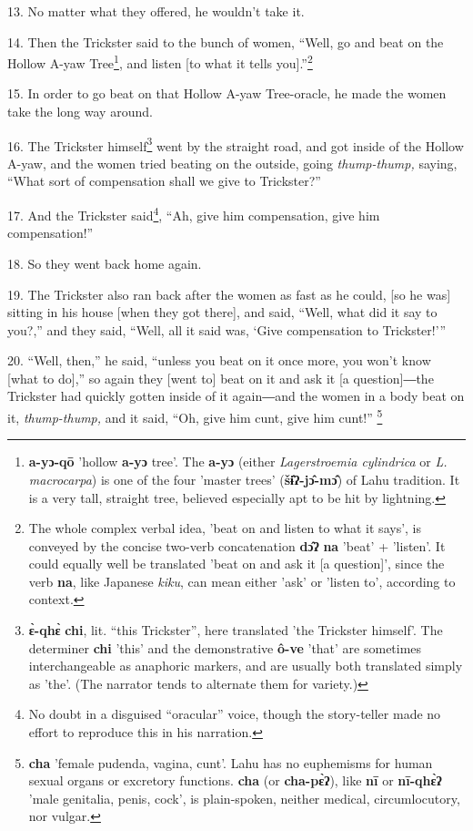 13. No matter what they offered, he wouldn't take it.

14. Then the Trickster said to the bunch of women, ``Well, go and beat on the Hollow
A-yaw Tree\footnote{\textbf{a-yɔ-qō} 'hollow \textbf{a-yɔ} tree'. The \textbf{a-yɔ} (either \textit{Lagerstroemia cylindrica }or \textit{L. macrocarpa}) is one of the four 'master trees' (\textbf{šɨ̂ʔ-jɔ̂-mɔ̂}) of Lahu tradition. It is a very tall, straight tree, believed especially apt to be hit by lightning.}, and listen [to what it tells you].''\footnote{The whole complex verbal idea, 'beat on and listen to what it says', is conveyed by the concise two-verb concatenation \textbf{dɔ̂ʔ} \textbf{na} 'beat' + 'listen'. It could equally well be translated 'beat on and ask it [a question]', since the verb \textbf{na}, like Japanese \textit{kiku}, can mean either 'ask' or 'listen to', according to context.}

15. In order to go beat on that Hollow A-yaw Tree-oracle, he made the women take
the long way around.

16. The Trickster himself\footnote{\textbf{ɛ̀-qhɛ̀} \textbf{chi}, lit. ``this Trickster'', here translated 'the Trickster himself'. The determiner \textbf{chi} 'this' and the demonstrative \textbf{ô-ve} 'that' are sometimes interchangeable as anaphoric markers, and are usually both translated simply as 'the'. (The narrator tends to alternate them for variety.)} went by the straight road, and got inside of the
Hollow A-yaw, and the women tried beating on the outside, going \textit{thump-thump,
}saying, ``What sort of compensation shall we give to Trickster?''

17. And the Trickster said\footnote{No doubt in a disguised ``oracular'' voice, though the story-teller made no effort to reproduce this in his narration.}, ``Ah, give him compensation, give him compensation!''

18. So they went back home again.

19. The Trickster also ran back after the women as fast as he could, [so he was]
sitting in his house [when they got there], and said, ``Well, what did it say to
you?,'' and they said, ``Well, all it said was, `Give compensation to Trickster!'''

20. ``Well, then,'' he said, ``unless you beat on it once more, you won't know
[what to do],'' so again they [went to] beat on it and ask it [a question]―the
Trickster had quickly gotten inside of it again―and the women in a body beat
on it,\textit{ thump-thump, }and it said, ``Oh, give him cunt, give him cunt!''
\footnote{\textbf{cha} 'female pudenda, vagina, cunt'. Lahu has no euphemisms for human sexual organs or excretory functions. \textbf{cha} (or \textbf{cha-pɛ̀ʔ}), like \textbf{nī} or \textbf{nī-qhɛ̀ʔ} 'male genitalia, penis, cock', is plain-spoken, neither medical, circumlocutory, nor vulgar.}

